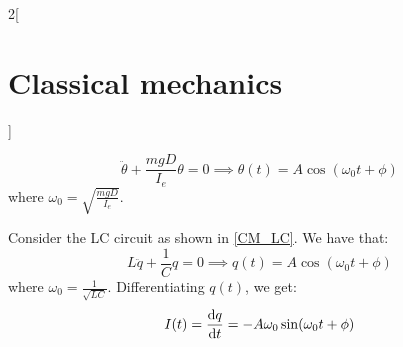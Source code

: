 \documentclass[../../../main_physics.tex]{subfiles}
\begin{document}
\begin{multicols}{2}[\section{Classical mechanics}]
\begin{proposition}
    $$\ddot{\theta}+\frac{mgD}{I_e}\theta=0\implies\theta(t)=A\cos(\omega_0t+\phi)$$ where $\omega_0=\sqrt{\frac{mgD}{I_e}}$.
    \begin{center}
      \begin{minipage}{\linewidth}
        \centering
        
        \label{CM_fig3}
      \end{minipage}
    \end{center}
  \end{proposition}
  \begin{proposition}
    Consider the LC circuit as shown in \cref{CM_LC}. We have that:
    $$L\ddot{q}+\frac{1}{C}q=0\implies q(t)=A\cos(\omega_0t+\phi)$$ where $\omega_0=\frac{1}{\sqrt{LC}}$. Differentiating $q(t)$, we get: $$I(t)=\dv{q}{t}=-A\omega_0\sin(\omega_0t+\phi)$$
    \begin{center}
      \begin{minipage}{\linewidth}
        \centering
        
        \label{CM_LC}
      \end{minipage}
    \end{center}
  \end{proposition}

\end{multicols}
\end{document}
